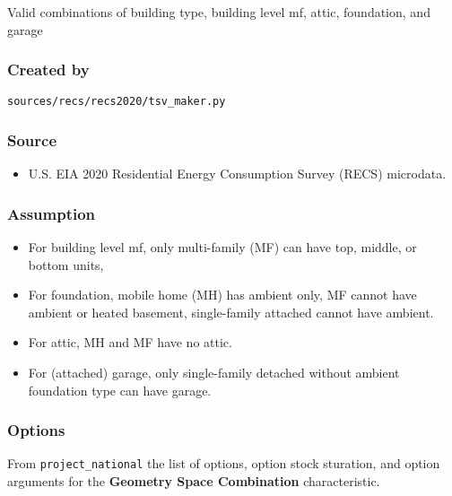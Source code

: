 Valid combinations of building type, building level mf, attic,
foundation, and garage

\subsubsection{Created by}\label{created-by-56}

\texttt{sources/recs/recs2020/tsv\_maker.py}

\subsubsection{Source}\label{source-55}

\begin{itemize}
 
\item
  U.S. EIA 2020 Residential Energy Consumption Survey (RECS) microdata.
\end{itemize}

\subsubsection{Assumption}\label{assumption-30}

\begin{itemize}
 
\item
  For building level mf, only multi-family (MF) can have top, middle, or
  bottom units,
\item
  For foundation, mobile home (MH) has ambient only, MF cannot have
  ambient or heated basement, single-family attached cannot have
  ambient.
\item
  For attic, MH and MF have no attic.
\item
  For (attached) garage, only single-family detached without ambient
  foundation type can have garage.
\end{itemize}

\subsubsection{Options}\label{options-56}

From \texttt{project\_national} the list of options, option stock
sturation, and option arguments for the \textbf{Geometry Space
Combination} characteristic.

